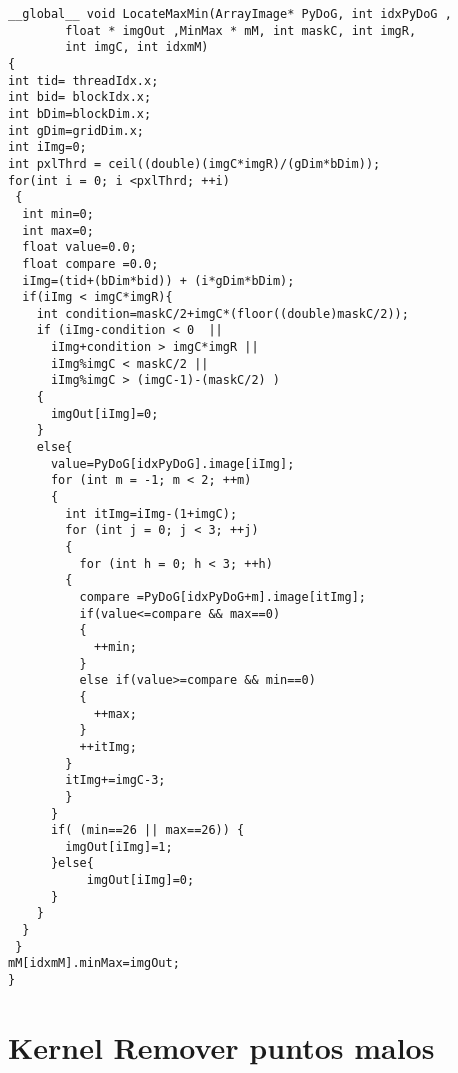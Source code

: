 \begin{small}
\begin{lstlisting}
__global__ void LocateMaxMin(ArrayImage* PyDoG, int idxPyDoG ,
		float * imgOut ,MinMax * mM, int maskC, int imgR,
		int imgC, int idxmM)
{
int tid= threadIdx.x;
int bid= blockIdx.x;
int bDim=blockDim.x;
int gDim=gridDim.x;
int iImg=0;
int pxlThrd = ceil((double)(imgC*imgR)/(gDim*bDim)); 
for(int i = 0; i <pxlThrd; ++i)
 {
  int min=0;
  int max=0;
  float value=0.0;
  float compare =0.0;
  iImg=(tid+(bDim*bid)) + (i*gDim*bDim); 
  if(iImg < imgC*imgR){
	int condition=maskC/2+imgC*(floor((double)maskC/2));
	if (iImg-condition < 0  ||										
	  iImg+condition > imgC*imgR ||								
	  iImg%imgC < maskC/2 ||										
	  iImg%imgC > (imgC-1)-(maskC/2) )							
	{                  
	  imgOut[iImg]=0;				
	}
	else{
	  value=PyDoG[idxPyDoG].image[iImg];
	  for (int m = -1; m < 2; ++m)
	  {
	    int itImg=iImg-(1+imgC);
	    for (int j = 0; j < 3; ++j)
	    {		
	      for (int h = 0; h < 3; ++h)
	  	{
	  	  compare =PyDoG[idxPyDoG+m].image[itImg];
	  	  if(value<=compare && max==0)
	  	  {
	  	  	++min;
	  	  }
	  	  else if(value>=compare && min==0)
	  	  {
	  	  	++max;
	  	  }
	  	  ++itImg;
	  	}
	  	itImg+=imgC-3;
	    }
	  }
 	  if( (min==26 || max==26)) {
	    imgOut[iImg]=1;
	  }else{
	       imgOut[iImg]=0;
	  }
	}
  }
 }
mM[idxmM].minMax=imgOut;
}
\end{lstlisting}

\end{small}
\pagebreak
\chapter{Kernel Remover puntos malos}

